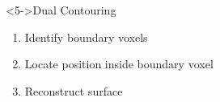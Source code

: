 \begin{frame}
\begin{minipage}[t]{0.4\linewidth}
{\begin{figure}
		\end{figure}}
\end{minipage}%
\hfill%
\begin{minipage}[t]{0.4\linewidth}
\begin{block}<5->{Dual Contouring}
	\begin{enumerate}
		\item<6-> Identify boundary voxels
		\item<7-> Locate position inside boundary voxel
		\item<8-> Reconstruct surface
	\end{enumerate}
\end{block}
\end{minipage}
\end{frame}
